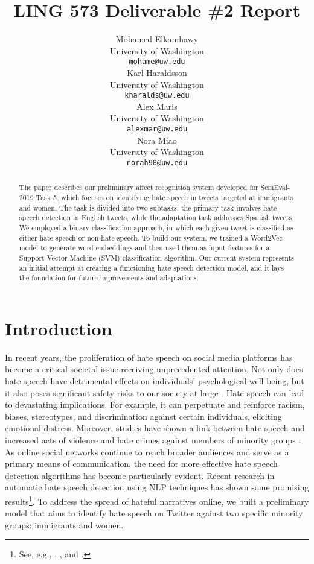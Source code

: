 \documentclass[11pt,a4paper]{article}
\title{LING 573 Deliverable \#2 Report}
\author{Mohamed Elkamhawy \\
  \small University of Washington \\
  \texttt{mohame@uw.edu} \\\And
  Karl Haraldsson \\
  \small University of Washington \\
  \texttt{kharalds@uw.edu} \\\And
  Alex Maris \\
  \small University of Washington \\
  \texttt{alexmar@uw.edu} \\\And
  Nora Miao \\
  \small University of Washington \\
  \texttt{norah98@uw.edu} \\
  }
\date{}
\begin{document}
\maketitle
\begin{abstract}
The paper describes our preliminary affect recognition system developed for SemEval-2019 Task 5, which focuses on identifying hate speech in tweets targeted at immigrants and women. The task is divided into two subtasks: the primary task involves hate speech detection in English tweets, while the adaptation task addresses Spanish tweets. We employed a binary classification approach, in which each given tweet is classified as either hate speech or non-hate speech. To build our system, we trained a Word2Vec model to generate word embeddings and then used them as input features for a Support Vector Machine (SVM) classification algorithm. Our current system represents an initial attempt at creating a functioning hate speech detection model, and it lays the foundation for future improvements and adaptations.
\end{abstract}

\section{Introduction}
    In recent years, the proliferation of hate speech on social media platforms has become a critical societal issue receiving unprecedented attention. Not only does hate speech have detrimental effects on individuals’ psychological well-being, but it also poses significant safety risks to our society at large \citep{saha2019prevalence}. Hate speech can lead to devastating implications. For example, it can perpetuate and reinforce racism, biases, stereotypes, and discrimination against certain individuals, eliciting emotional distress. Moreover, studies have shown a link between hate speech and increased acts of violence and hate crimes against members of minority groups \citep{relia2019race}. As online social networks continue to reach broader audiences and serve as a primary means of communication, the need for more effective hate speech detection algorithms has become particularly evident. Recent research in automatic hate speech detection using NLP techniques has shown some promising results\footnote{See, e.g., \citet{asogwa2022hate},  \citet{kotarcic2023humanintheloop}, and \citet{schmidt-wiegand-2017-survey}.}. To address the spread of hateful narratives online, we built a preliminary model that aims to identify hate speech on Twitter against two specific minority groups: immigrants and women.
\end{document}
